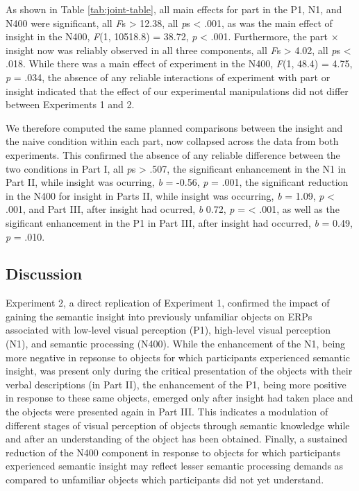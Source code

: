 \documentclass[
  english,
  man,11pt,floatsintext]{apa7}
\begin{document}
As shown in Table \ref{tab:joint-table}, all main effects for part in the P1, N1, and N400 were significant, all \emph{F}s \textgreater{} 12.38, all \emph{p}s \textless{} .001, as was the main effect of insight in the N400, \emph{F}(1, 10518.8) = 38.72, \emph{p} \textless{} .001. Furthermore, the part × insight now was reliably observed in all three components, all \emph{F}s \textgreater{} 4.02, all \emph{p}s \textless{} .018. While there was a main effect of experiment in the N400, \emph{F}(1, 48.4) = 4.75, \emph{p} = .034, the absence of any reliable interactions of experiment with part or insight indicated that the effect of our experimental manipulations did not differ between Experiments 1 and 2.

We therefore computed the same planned comparisons between the insight and the naive condition within each part, now collapsed across the data from both experiments. This confirmed the absence of any reliable difference between the two conditions in Part I, all \emph{p}s \textgreater{} .507, the significant enhancement in the N1 in Part II, while insight was ocurring, \emph{b} = -0.56, \emph{p} = .001, the significant reduction in the N400 for insight in Parts II, while insight was occurring, \emph{b} = 1.09, \emph{p} \textless{} .001, and Part III, after insight had ocurred, \emph{b} 0.72, \emph{p} = \textless{} .001, as well as the sigificant enhancement in the P1 in Part III, after insight had occurred, \emph{b} = 0.49, \emph{p} = .010.

\hypertarget{discussion-1}{%
\subsection{Discussion}\label{discussion-1}}

Experiment 2, a direct replication of Experiment 1, confirmed the impact of gaining the semantic insight into previously unfamiliar objects on ERPs associated with low-level visual perception (P1), high-level visual perception (N1), and semantic processing (N400). While the enhancement of the N1, being more negative in repsonse to objects for which participants experienced semantic insight, was present only during the critical presentation of the objects with their verbal descriptions (in Part II), the enhancement of the P1, being more positive in response to these same objects, emerged only after insight had taken place and the objects were presented again in Part III. This indicates a modulation of different stages of visual perception of objects through semantic knowledge while and after an understanding of the object has been obtained. Finally, a sustained reduction of the N400 component in response to objects for which participants experienced semantic insight may reflect lesser semantic processing demands as compared to unfamiliar objects which participants did not yet understand.
\end{document}
